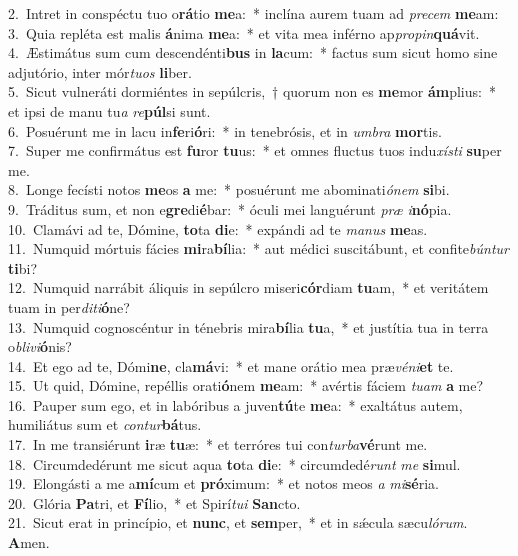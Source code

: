 {2.~}Intret in conspéctu tuo o\textbf{rá}tio \textbf{me}a:~* inclína aurem tuam ad \textit{pre}\textit{cem} \textbf{me}am:\\
{3.~}Quia repléta est malis \textbf{á}nima \textbf{me}a:~* et vita mea inférno ap\textit{pro}\textit{pin}\textbf{quá}vit.\\
{4.~}Æstimátus sum cum descendénti\textbf{bus} in \textbf{la}cum:~* factus sum sicut homo sine adjutório, inter mór\textit{tu}\textit{os} \textbf{li}ber.\\
{5.~}Sicut vulneráti dormiéntes in sepúlcris,~† quorum non es \textbf{me}mor \textbf{ám}plius:~* et ipsi de manu tu\textit{a} \textit{re}\textbf{púl}si sunt.\\
{6.~}Posuérunt me in lacu in\textbf{fe}ri\textbf{ó}ri:~* in tenebrósis, et in \textit{um}\textit{bra} \textbf{mor}tis.\\
{7.~}Super me confirmátus est \textbf{fu}ror \textbf{tu}us:~* et omnes fluctus tuos indu\textit{xí}\textit{sti} \textbf{su}per me.\\
{8.~}Longe fecísti notos \textbf{me}os \textbf{a} me:~* posuérunt me abominati\textit{ó}\textit{nem} \textbf{si}bi.\\
{9.~}Tráditus sum, et non e\textbf{gre}di\textbf{é}bar:~* óculi mei languérunt \textit{præ} \textit{i}\textbf{nó}pia.\\
{10.~}Clamávi ad te, Dómine, \textbf{to}ta \textbf{di}e:~* expándi ad te \textit{ma}\textit{nus} \textbf{me}as.\\
{11.~}Numquid mórtuis fácies \textbf{mi}ra\textbf{bí}lia:~* aut médici suscitábunt, et confite\textit{bún}\textit{tur} \textbf{ti}bi?\\
{12.~}Numquid narrábit áliquis in sepúlcro miseri\textbf{cór}diam \textbf{tu}am,~* et veritátem tuam in per\textit{di}\textit{ti}\textbf{ó}ne?\\
{13.~}Numquid cognoscéntur in ténebris mira\textbf{bí}lia \textbf{tu}a,~* et justítia tua in terra o\textit{bli}\textit{vi}\textbf{ó}nis?\\
{14.~}Et ego ad te, Dómi\textbf{ne}, cla\textbf{má}vi:~* et mane orátio mea præ\textit{vé}\textit{ni}\textbf{et} te.\\
{15.~}Ut quid, Dómine, repéllis orati\textbf{ó}nem \textbf{me}am:~* avértis fáciem \textit{tu}\textit{am} \textbf{a} me?\\
{16.~}Pauper sum ego, et in labóribus a juven\textbf{tú}te \textbf{me}a:~* exaltátus autem, humiliátus sum et \textit{con}\textit{tur}\textbf{bá}tus.\\
{17.~}In me transiérunt \textbf{i}ræ \textbf{tu}æ:~* et terróres tui con\textit{tur}\textit{ba}\textbf{vé}runt me.\\
{18.~}Circumdedérunt me sicut aqua \textbf{to}ta \textbf{di}e:~* circumdedé\textit{runt} \textit{me} \textbf{si}mul.\\
{19.~}Elongásti a me a\textbf{mí}cum et \textbf{pró}ximum:~* et notos meos \textit{a} \textit{mi}\textbf{sé}ria.\\
{20.~}Glória \textbf{Pa}tri, et \textbf{Fí}lio,~* et Spirí\textit{tu}\textit{i} \textbf{San}cto.\\
{21.~}Sicut erat in princípio, et \textbf{nunc}, et \textbf{sem}per,~* et in sǽcula sæcu\textit{ló}\textit{rum}. \textbf{A}men.\\
